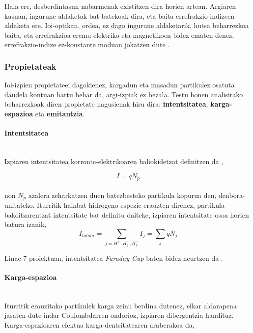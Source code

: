 \documentclass[12pt]{article}
\numberwithin{figure}{section}
\numberwithin{equation}{section}
\begin{document}
Hala ere, desberdintasun nabarmenak existitzen dira horien artean. Argiaren kasuan, ingurune aldaketak bat-batekoak dira, eta baita errefrakzio-indizeen aldaketa ere. Ioi-optikan, ordea, ez dago ingurune aldaketarik, hutsa beharrezkoa baita, eta errefrakzioa eremu elektriko eta magnetikoen bidez ematen denez, errefrakzio-indize ez-konstante moduan jokatzen dute \cite{manura_simion_2008}. 

\subsubsection{Propietateak}
Ioi-izpien propietateei dagokienez, kargadun eta masadun partikulez osatuta daudela kontuan hartu behar da, argi-izpiak ez bezala. Testu honen analisirako beharrezkoak diren propietate nagusienak hiru dira: \textbf{intentsitatea}, \textbf{karga-espazioa} eta \textbf{emitantzia}.
\paragraph{Intentsitatea} \leavevmode\\

Izpiaren intentsitatea korronte-elektrikoaren baliokidetzat definitzen da \cite{scrivens_requirements_2014},

\begin{equation}
    I = q N_p
\end{equation}
\\
non $N_p$ azalera zeharkatzen duen batezbesteko partikula kopurua den, denbora-unitateko. Iturritik hainbat hidrogeno espezie erauzten direnez, partikula bakoitzarentzat intentsitate bat definitu daiteke, izpiaren intentsitate osoa horien batura izanik, \\
\begin{equation}
    I_{totala} = \sum_{j={H^+},{H_2^+},{H_3^+}}I_j = \sum_j qN_j
\end{equation}

Linac-7 proiektuan, intentsitatea \textit{Faraday Cup} baten bidez neurtzen da \cite{feuchtwanger_new_2022}.
\paragraph{Karga-espazioa}\leavevmode\\

Iturritik erauzitako partikulek karga zeinu berdina dutenez, elkar aldarapena jasaten dute indar Coulombdarren ondorioz, izpiaren dibergentzia handituz. Karga\hyp{}espazioaren efektua karga-dentsitatearen araberakoa da,
\end{document}
